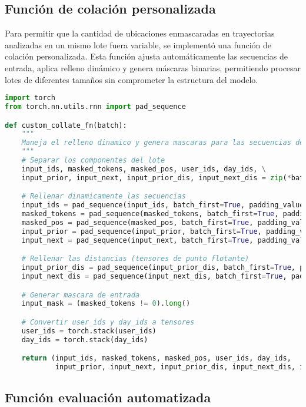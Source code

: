 \subsection{Función de colación personalizada}
\label{apx:dynamic_padding}

Para permitir que la cantidad de ubicaciones enmascaradas en trayectorias analizadas en un mismo lote fuera variable, se implementó una función de colación personalizada. Esta función ajusta automáticamente las secuencias de entrada, aplica relleno dinámico y genera máscaras binarias, permitiendo procesar lotes de diferentes tamaños sin comprometer la estructura del modelo.

\begin{lstlisting}[language=Python, caption={Función de colación para manejo dinámico de secuencias.}]
import torch
from torch.nn.utils.rnn import pad_sequence

def custom_collate_fn(batch):
    """
    Maneja el relleno dinamico y genera mascaras para las secuencias de longitud variable.
    """
    # Separar los componentes del lote
    input_ids, masked_tokens, masked_pos, user_ids, day_ids, \
    input_prior, input_next, input_prior_dis, input_next_dis = zip(*batch)

    # Rellenar dinamicamente las secuencias
    input_ids = pad_sequence(input_ids, batch_first=True, padding_value=0)
    masked_tokens = pad_sequence(masked_tokens, batch_first=True, padding_value=0)
    masked_pos = pad_sequence(masked_pos, batch_first=True, padding_value=0)
    input_prior = pad_sequence(input_prior, batch_first=True, padding_value=0)
    input_next = pad_sequence(input_next, batch_first=True, padding_value=0)

    # Rellenar las distancias (tensores de punto flotante)
    input_prior_dis = pad_sequence(input_prior_dis, batch_first=True, padding_value=0.0)
    input_next_dis = pad_sequence(input_next_dis, batch_first=True, padding_value=0.0)

    # Generar mascara de entrada
    input_mask = (masked_tokens != 0).long()

    # Convertir user_ids y day_ids a tensores
    user_ids = torch.stack(user_ids)
    day_ids = torch.stack(day_ids)

    return (input_ids, masked_tokens, masked_pos, user_ids, day_ids, 
            input_prior, input_next, input_prior_dis, input_next_dis, input_mask)
\end{lstlisting}

\subsection{Función evaluación automatizada}
\label{apx:evaluate_all_models}

